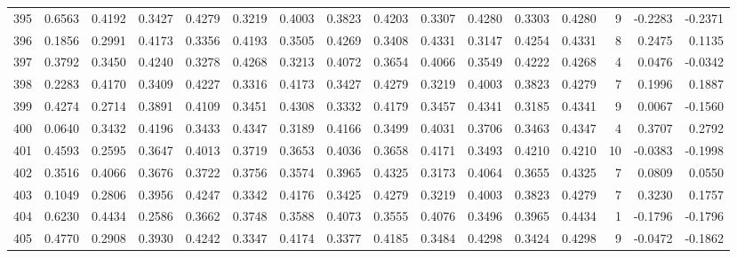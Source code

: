 \begin{tabular}{lrrrrrrrrrrrrrrr}
395 &      0.6563 &  0.4192 &  0.3427 &  0.4279 &  0.3219 &  0.4003 &  0.3823 &  0.4203 &  0.3307 &  0.4280 &   0.3303 &     0.4280 &      9 &                   -0.2283 &                    -0.2371 \\
396 &      0.1856 &  0.2991 &  0.4173 &  0.3356 &  0.4193 &  0.3505 &  0.4269 &  0.3408 &  0.4331 &  0.3147 &   0.4254 &     0.4331 &      8 &                    0.2475 &                     0.1135 \\
397 &      0.3792 &  0.3450 &  0.4240 &  0.3278 &  0.4268 &  0.3213 &  0.4072 &  0.3654 &  0.4066 &  0.3549 &   0.4222 &     0.4268 &      4 &                    0.0476 &                    -0.0342 \\
398 &      0.2283 &  0.4170 &  0.3409 &  0.4227 &  0.3316 &  0.4173 &  0.3427 &  0.4279 &  0.3219 &  0.4003 &   0.3823 &     0.4279 &      7 &                    0.1996 &                     0.1887 \\
399 &      0.4274 &  0.2714 &  0.3891 &  0.4109 &  0.3451 &  0.4308 &  0.3332 &  0.4179 &  0.3457 &  0.4341 &   0.3185 &     0.4341 &      9 &                    0.0067 &                    -0.1560 \\
400 &      0.0640 &  0.3432 &  0.4196 &  0.3433 &  0.4347 &  0.3189 &  0.4166 &  0.3499 &  0.4031 &  0.3706 &   0.3463 &     0.4347 &      4 &                    0.3707 &                     0.2792 \\
401 &      0.4593 &  0.2595 &  0.3647 &  0.4013 &  0.3719 &  0.3653 &  0.4036 &  0.3658 &  0.4171 &  0.3493 &   0.4210 &     0.4210 &     10 &                   -0.0383 &                    -0.1998 \\
402 &      0.3516 &  0.4066 &  0.3676 &  0.3722 &  0.3756 &  0.3574 &  0.3965 &  0.4325 &  0.3173 &  0.4064 &   0.3655 &     0.4325 &      7 &                    0.0809 &                     0.0550 \\
403 &      0.1049 &  0.2806 &  0.3956 &  0.4247 &  0.3342 &  0.4176 &  0.3425 &  0.4279 &  0.3219 &  0.4003 &   0.3823 &     0.4279 &      7 &                    0.3230 &                     0.1757 \\
404 &      0.6230 &  0.4434 &  0.2586 &  0.3662 &  0.3748 &  0.3588 &  0.4073 &  0.3555 &  0.4076 &  0.3496 &   0.3965 &     0.4434 &      1 &                   -0.1796 &                    -0.1796 \\
405 &      0.4770 &  0.2908 &  0.3930 &  0.4242 &  0.3347 &  0.4174 &  0.3377 &  0.4185 &  0.3484 &  0.4298 &   0.3424 &     0.4298 &      9 &                   -0.0472 &                    -0.1862 \\

\end{tabular}
